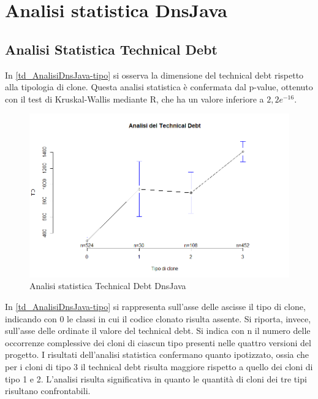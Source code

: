 \newpage
\section{Analisi statistica DnsJava}

\subsection{Analisi Statistica Technical Debt}
In \autoref{td_AnalisiDnsJava-tipo} si osserva la dimensione del technical debt rispetto alla tipologia di clone. Questa analisi statistica è confermata dal p-value, ottenuto con il test di Kruskal-Wallis mediante R, che ha un valore inferiore a $2,2 e^{-16}$.
\begin{figure}[htbp]
	\centering
	\includegraphics[scale=0.5]{analisi_R/AnalisiDnsJava/1-gplot-td-type.png}
\caption{Analisi statistica Technical Debt DnsJava}
\label{td_AnalisiDnsJava-tipo}
\end{figure}

In \autoref{td_AnalisiDnsJava-tipo} si rappresenta sull'asse delle ascisse il tipo di clone, indicando con 0 le classi in cui il codice clonato risulta assente. Si riporta, invece, sull'asse delle ordinate il valore del technical debt. Si indica con n il numero delle occorrenze complessive dei cloni di ciascun tipo presenti nelle quattro versioni del progetto. I risultati dell'analisi statistica confermano quanto ipotizzato, ossia che per i cloni di tipo 3 il technical debt risulta maggiore rispetto a quello dei cloni di tipo 1 e 2. L'analisi risulta significativa in quanto le quantità di cloni dei tre tipi risultano confrontabili.
